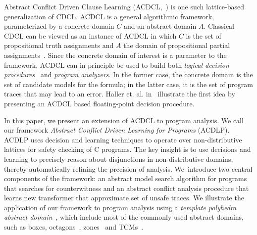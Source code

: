 Abstract Conflict Driven Clause Learning (ACDCL,~\cite{dhk2013-popl}) is one 
such lattice-based generalization of CDCL.  ACDCL is a general algorithmic 
framework, parameterized by a concrete domain $C$  and an abstract domain
$A$. Classical CDCL can be viewed as an instance of ACDCL 
in which $C$ is the set of propositional truth assignments and $A$ the 
domain of propositional partial assignments~\cite{leo-thesis}.  Since 
the concrete domain of interest is a parameter to the framework, 
ACDCL can in principle be used to build both 
\emph{logical decision procedures}~\cite{DBLP:journals/fmsd/BrainDGHK14} 
and \emph{program analyzers}.  In the former case, the concrete domain is the 
set of candidate models for the formula; in the latter case, it is the 
set of program traces that may lead to an error.  Haller et. al. 
in~\cite{DBLP:journals/fmsd/BrainDGHK14,sas13,fmcad12} illustrate the 
first idea by presenting an ACDCL based floating-point decision procedure.  
%


In this paper, we present an extension of ACDCL to program analysis.
We call our framework \emph{Abstract Conflict Driven Learning for Programs}
(ACDLP).   ACDLP uses decision and learning techniques to operate over
non-distributive lattices for safety checking of C programs.  The key insight
is to use decisions and learning to precisely reason about disjunctions in
non-distributive domains, thereby automatically refining the precision of
analysis.  We~introduce two central components of the framework: an abstract
model search algorithm for programs that searches for counterwitness and an 
abstract conflict analysis procedure that learns new transformer that
approximate set of unsafe traces.  
We illustrate the application of our framework to program analysis 
using a \textit{template polyhedra abstract domain}~\cite{tacas08}, which 
include most of the commonly used abstract domains, such as boxes, 
octagons~\cite{octagon}, zones~\cite{minethesis} and TCMs~\cite{vmcai05}.  

